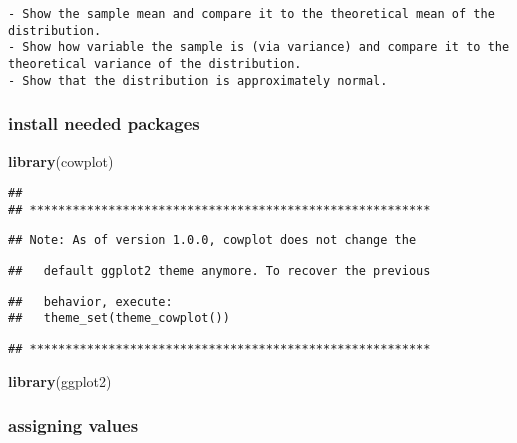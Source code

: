 \documentclass[
]{article}
\newenvironment{Shaded}{\begin{snugshade}}{\end{snugshade}}
\newcommand{\KeywordTok}[1]{\textcolor[rgb]{0.13,0.29,0.53}{\textbf{#1}}}
\newcommand{\NormalTok}[1]{#1}
\begin{document}
\begin{verbatim}
- Show the sample mean and compare it to the theoretical mean of the distribution.
- Show how variable the sample is (via variance) and compare it to the theoretical variance of the distribution.
- Show that the distribution is approximately normal.
\end{verbatim}

\hypertarget{install-needed-packages}{%
\subsubsection{install needed packages}\label{install-needed-packages}}

\begin{Shaded}
\begin{Highlighting}[]
\KeywordTok{library}\NormalTok{(cowplot)}
\end{Highlighting}
\end{Shaded}

\begin{verbatim}
## 
## ********************************************************
\end{verbatim}

\begin{verbatim}
## Note: As of version 1.0.0, cowplot does not change the
\end{verbatim}

\begin{verbatim}
##   default ggplot2 theme anymore. To recover the previous
\end{verbatim}

\begin{verbatim}
##   behavior, execute:
##   theme_set(theme_cowplot())
\end{verbatim}

\begin{verbatim}
## ********************************************************
\end{verbatim}

\begin{Shaded}
\begin{Highlighting}[]
\KeywordTok{library}\NormalTok{(ggplot2)}
\end{Highlighting}
\end{Shaded}

\hypertarget{assigning-values}{%
\subsubsection{assigning values}\label{assigning-values}}
\end{document}
